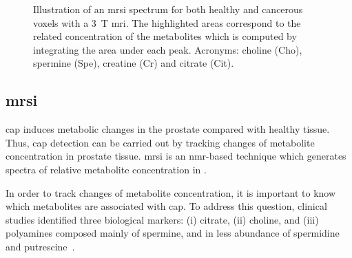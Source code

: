 \begin{figure}
  \centering
  \hspace*{\fill}
  \hfill
  \hspace*{\fill}
  \caption[Illustration of healthy and cancerous \acs*{mrsi}
  spectrum.]{Illustration of an \acs*{mrsi} spectrum for both healthy and
    cancerous voxels with a \SI{3}{\tesla} \acs*{mri}. The highlighted areas
    correspond to the related concentration of the metabolites which is
    computed by integrating the area under each peak. Acronyms: choline (Cho),
    spermine (Spe), creatine (Cr) and citrate (Cit).}
  \label{fig:mrsi}
\end{figure}

\subsection{\acs*{mrsi}}\label{subsec:chp2:imaging:mrsi}
\ac{cap} induces metabolic changes in the prostate compared with healthy tissue.
Thus, \ac{cap} detection can be carried out by tracking changes of metabolite
concentration in prostate tissue.
\ac{mrsi} is an \ac{nmr}-based technique which generates spectra of relative
metabolite concentration in .

In order to track changes of metabolite concentration, it is important to know
which metabolites are associated with \ac{cap}.
To address this question, clinical studies identified three biological markers:
(i) citrate, (ii) choline, and (iii) polyamines composed mainly of spermine,
and in less abundance of spermidine and
putrescine~\cite{Awwad2012,Costello2006,Giskeodegard2013}.


